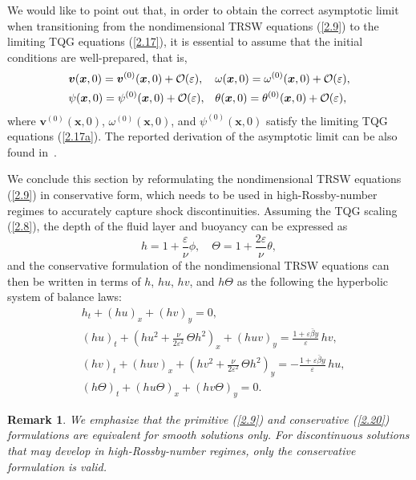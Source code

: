 \documentclass[a4paper,11pt,twoside]{article}
\newtheorem{rmk}{Remark}[section]
\numberwithin{equation}{section}
\numberwithin{figure}{section}
\numberwithin{table}{section}
\newcommand{\eps}{\varepsilon}
\newcommand{\bx}{\bm{x}}
\newcommand{\bv}{\bm{v}}
\newcommand\eref[1]{(\ref{#1})}
\newcommand{\RIIIcolor}[1]{{\leavevmode\color{magenta} #1}}
\begin{document}
We would like to point out that, in order to obtain the correct asymptotic limit when transitioning from the nondimensional TRSW equations 
\eref{2.9} to the limiting TQG equations \eref{2.17}, it is essential to assume that the initial conditions are well-prepared, that is,
\begin{equation}
\begin{aligned}
&\bv(\bx,0)=\bv^{(0)}(\bx,0)+{\cal O}(\eps),&&\omega(\bx,0)=\omega^{(0)}(\bx,0)+{\cal O}(\eps),\\
&\psi(\bx,0)=\psi^{(0)}(\bx,0)+{\cal O}(\eps),&&\theta(\bx,0)=\theta^{(0)}(\bx,0)+{\cal O}(\eps),
\end{aligned}
\label{2.18}
\end{equation}
where $\bv^{(0)}(\bx,0)$, $\omega^{(0)}(\bx,0)$, and $\psi^{(0)}(\bx,0)$ satisfy the limiting TQG equations \eref{2.17a}. 
%
\RIIIcolor{The reported derivation of the asymptotic limit can be also found in~\cite{Warneford_2013}.} 

We conclude this section by reformulating the nondimensional TRSW equations \eref{2.9} in conservative form, which needs to be used in 
high-Rossby-number regimes to accurately capture shock discontinuities. Assuming the TQG scaling \eref{2.8}, the depth of the fluid layer
and buoyancy can be expressed as
\begin{equation}
h=1+\frac{\eps}{\nu}\phi,\quad\Theta=1+\frac{2\eps}{\nu}\theta,
\label{2.19}
\end{equation}
and the conservative formulation of the nondimensional TRSW equations can then be written in terms of $h$, $hu$, $hv$, and $h\Theta$ as the 
following the hyperbolic system of balance laws:
\begin{equation}
\begin{aligned}
&h_t+(hu)_x+(hv)_y=0,\\
&(hu)_t+\left(hu^2+\frac{\nu}{2\eps^2}\,\Theta h^2\right)_x+(huv)_y=\frac{1+\eps\bar\beta y}{\eps}\,hv,\\
&(hv)_t+(huv)_x+\left(hv^2+\frac{\nu}{2\eps^2}\,\Theta h^2\right)_y=-\frac{1+\eps\bar\beta y}{\eps}\,hu,\\
&(h\Theta)_t+(hu\Theta)_x+(hv\Theta)_y=0.
\end{aligned}
\label{2.20}
\end{equation}
\begin{rmk}
We emphasize that the primitive \eref{2.9} and conservative \eref{2.20} formulations are equivalent for smooth solutions only. For 
discontinuous solutions that may develop in high-Rossby-number regimes, only the conservative formulation is valid.
\end{rmk}
\end{document}
